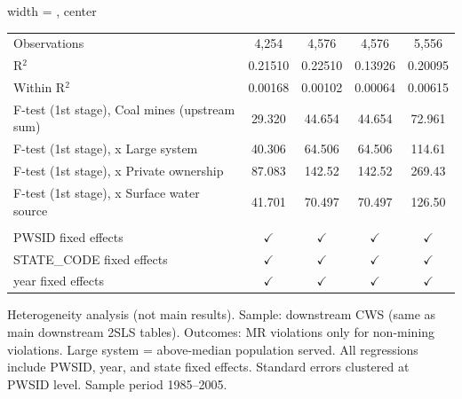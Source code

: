 \begin{table}[htbp]
\begin{adjustbox}{width = \textwidth, center}
\begin{tabular}{lcccc}
          \\
         
         Observations                                  & 4,254               & 4,576               & 4,576         & 5,556\\  
         R$^2$                                         & 0.21510             & 0.22510             & 0.13926       & 0.20095\\  
         Within R$^2$                                  & 0.00168             & 0.00102             & 0.00064       & 0.00615\\  
         F-test (1st stage), Coal mines (upstream sum) & 29.320              & 44.654              & 44.654        & 72.961\\  
         F-test (1st stage),   x Large system          & 40.306              & 64.506              & 64.506        & 114.61\\  
         F-test (1st stage),   x Private ownership     & 87.083              & 142.52              & 142.52        & 269.43\\  
         F-test (1st stage),   x Surface water source  & 41.701              & 70.497              & 70.497        & 126.50\\  
         
          \\
         
         PWSID fixed effects                           & $\checkmark$        & $\checkmark$        & $\checkmark$  & $\checkmark$\\   
         STATE\_CODE fixed effects                     & $\checkmark$        & $\checkmark$        & $\checkmark$  & $\checkmark$\\   
         year fixed effects                            & $\checkmark$        & $\checkmark$        & $\checkmark$  & $\checkmark$\\   
         
         \bottomrule
         
      \end{tabular}
      
      
      
   \end{adjustbox}
      {\tiny\linespread{1}\selectfont \par \raggedright 
   Heterogeneity analysis (not main results). Sample: downstream CWS (same as main downstream 2SLS tables). Outcomes: MR violations only for non-mining violations. Large system = above-median population served. All regressions include PWSID, year, and state fixed effects. Standard errors clustered at PWSID level. Sample period 1985--2005.}
   
\end{table}


